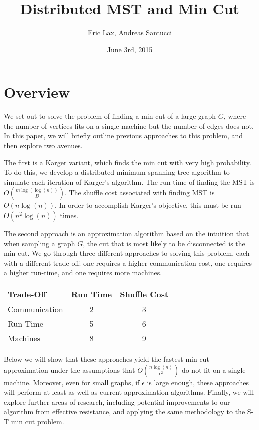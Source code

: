 \documentclass[12pt]{article}
\begin{document}
 

\title{\textbf{Distributed MST and Min Cut}}
\author{Eric Lax, Andreas Santucci}
\date{June 3rd, 2015}
\maketitle

\section*{Overview}

We set out to solve the problem of finding a min cut of a large graph $G$, where the number of vertices fits on a single machine but the number of edges does not. In this paper, we will briefly outline previous approaches to this problem, and then explore two avenues. 

The first is a Karger variant, which finds the min cut with very high probability. To do this, we develop a distributed minimum spanning tree algorithm to simulate each iteration of Karger's algorithm. The run-time of finding the MST is $O(\frac{m \log(\log(n))}{B})$. The shuffle cost associated with finding MST is $O(n \log(n))$. In order to accomplish Karger's objective, this must be run $O(n^2 \log(n))$ times. 

The second approach is an approximation algorithm based on the intuition that when sampling a graph $G$, the cut that is most likely to be disconnected is the min cut. We go through three different approaches to solving this problem, each with a different trade-off: one requires a higher communication cost, one requires a higher run-time, and one requires more machines.

\begin{center}
\begin{tabular}{ l | c | c }
  Trade-Off & Run Time & Shuffle Cost \\
\hline
  Communication & 2 & 3 \\
  Run Time & 5 & 6 \\
  Machines & 8 & 9 \\
\hline
\end{tabular}
\end{center}

Below we will show that these approaches yield the fastest min cut approximation under the assumptions that $O(\frac{n\log(n)}{\epsilon^2})$ do not fit on a single machine. Moreover, even for small graphs, if $\epsilon$ is large enough, these approaches will perform at least as well as current approximation algorithms. Finally, we will explore further areas of research, including potential improvements to our algorithm from effective resistance, and applying the same methodology to the S-T min cut problem.
\end{document}
